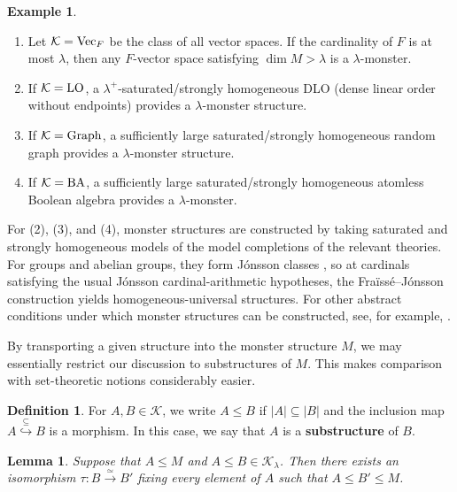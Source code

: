 \documentclass[10pt]{amsart}
\numberwithin{equation}{section}
\theoremstyle{plain}
\newtheorem{lemma}[theorem]{Lemma}
\theoremstyle{definition}
\newtheorem{definition}[theorem]{Definition}
\newtheorem{example}[theorem]{Example}
\newcommand{\K}{\mathcal{K}}
\newcommand{\embed}{\hookrightarrow}
\newcommand{\edge}[1]{\overset{#1}{\longrightarrow}}
\newcommand{\embedge}[1]{\overset{#1}{\embed}}
\begin{document}
\begin{example}~
\begin{enumerate}
\item Let $\K={\rm Vec}_F$ be the class of all vector spaces.
If the cardinality of $F$ is at most $\lambda$, then any $F$-vector space satisfying $\dim M>\lambda$ is a $\lambda$-monster.
\item If $\K={\rm LO}$, a $\lambda^+$-saturated/strongly homogeneous DLO (dense linear order without endpoints) provides a $\lambda$-monster structure.
\item If $\K={\rm Graph}$, a sufficiently large saturated/strongly homogeneous random graph provides a $\lambda$-monster structure.
\item If $\K={\rm BA}$, a sufficiently large saturated/strongly homogeneous atomless Boolean algebra provides a $\lambda$-monster.
\end{enumerate}
\end{example}

For (2), (3), and (4), monster structures are constructed by taking saturated and strongly homogeneous models of the model completions of the relevant theories.
For groups and abelian groups, they form J\'onsson classes \cite{Jon60,BHK13}, so at cardinals satisfying the usual J\'onsson cardinal-arithmetic hypotheses, the Fra\"iss\'e--J\'onsson construction yields homogeneous-universal structures.
For other abstract conditions under which monster structures can be constructed, see, for example, \cite{Kub14}.

By transporting a given structure into the monster structure $M$, we may essentially restrict our discussion to substructures of $M$.
This makes comparison with set-theoretic notions considerably easier.


\begin{definition}
For $A,B\in\K$, we write $A\leq B$ if $|A|\subseteq|B|$ and the inclusion map $A\embedge{\subseteq}B$ is a morphism.
In this case, we say that $A$ is a {\bf substructure} of $B$.
\end{definition}

\begin{lemma}\label{lem:substructure-lem}
Suppose that $A\leq M$ and $A\leq B\in\K_\lambda$.
Then there exists an isomorphism $\tau\colon B\edge{\simeq}B'$ fixing every element of $A$ such that $A\leq B'\leq M$.
\end{lemma}
\end{document}
